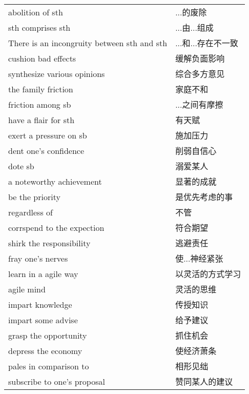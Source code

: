 \begin{tabular}{ll}
    abolition of sth                            & ...的废除       \\
    sth comprises sth                           & ...由...组成    \\
    There is an incongruity between sth and sth & ...和...存在不一致 \\
    cushion bad effects                         & 缓解负面影响       \\
    synthesize various opinions                 & 综合多方意见       \\

    the family friction                         & 家庭不和         \\
    friction among sb                           & ...之间有摩擦     \\
    have a flair for sth                        & 有天赋          \\
    exert a pressure on sb                      & 施加压力         \\
    dent one's confidence                       & 削弱自信心        \\
    dote sb                                     & 溺爱某人         \\
    a noteworthy achievement                    & 显著的成就        \\
    be the priority                             & 是优先考虑的事      \\
    regardless of                               & 不管           \\
    corrspend to the expection                  & 符合期望         \\
    shirk the responsibility                    & 逃避责任         \\
    fray one's nerves                           & 使...神经紧张     \\
    learn in a agile way                        & 以灵活的方式学习     \\
    agile mind                                  & 灵活的思维        \\
    impart knowledge                            & 传授知识         \\
    impart some advise                          & 给予建议         \\
    grasp the opportunity                       & 抓住机会         \\
    depress the economy                         & 使经济萧条        \\
    pales in comparison to                      & 相形见绌         \\
    subscribe to one's proposal                 & 赞同某人的建议      \\
\end{tabular}

